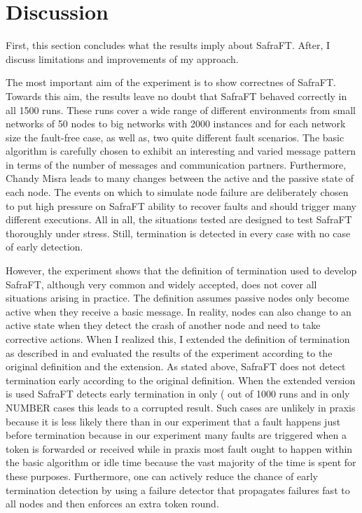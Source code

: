 \section{Discussion}
First, this section concludes what the results imply about SafraFT. After, I discuss limitations and improvements of my approach.

The most important aim of the experiment is to show correctnes of SafraFT.
Towards this aim, the results leave no doubt that SafraFT behaved correctly in all 1500 %
runs.
These runs cover a wide range of different environments from small networks of 50 nodes to big networks with 2000 instances and for each network size the fault-free case, as well as, two quite different fault scenarios.
The basic algorithm is carefully chosen to exhibit an interesting and varied message pattern in terms of the number of messages and communication partners.
Furthermore, Chandy Misra leads to many changes between the active and the passive state of each node.
The events on which to simulate node failure are deliberately chosen to put high pressure on SafraFT ability to recover faults and should trigger many different executions.
All in all, the situations tested are designed to test SafraFT thoroughly under stress.
Still, termination is detected in every case with no case of early detection.

However, the experiment shows that the definition of termination used to develop SafraFT, although very common and widely accepted, does not cover all situations arising in practice.
The definition assumes passive nodes only become active when they receive a basic message.
In reality, nodes can also change to an active state when they detect the crash of another node and need to take corrective actions.
When I realized this, I extended the definition of termination as described in \label{extended-definition} and evaluated the results of the experiment according to the original definition and the extension.
As stated above, SafraFT does not detect termination early according to the original definition.
When the extended version is used SafraFT detects early termination in only ( out of 1000 runs and in only NUMBER cases this leads to a corrupted result. %
Such cases are unlikely in praxis because it is less likely there than in our experiment that a fault happens just before termination because in our experiment many faults are triggered when a token is forwarded or received while in praxis most fault ought to happen within the basic algorithm or idle time because the vast majority of the time is spent for these purposes.
Furthermore, one can actively reduce the chance of early termination detection by using a failure detector that propagates failures fast to all nodes and then enforces an extra token round.



